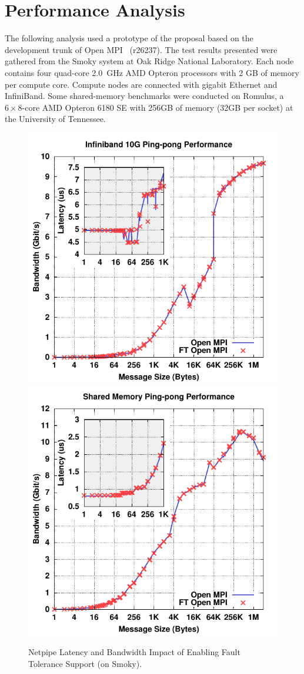 \section{Performance Analysis}
\label{sect:performance}

The following analysis used a prototype of the \ulfm proposal based on
the development trunk of Open MPI~\cite{gabriel04:_open_mpi} (r26237).
The test results presented were gathered from the Smoky system at Oak
Ridge National Laboratory. Each node contains four quad-core 2.0~GHz AMD
Opteron processors with 2 GB of memory per compute core. Compute nodes
are connected with gigabit Ethernet and InfiniBand. Some shared-memory
benchmarks were conducted on Romulus, a $6\times8$-core AMD Opteron 6180
SE with 256GB of memory (32GB per socket) at the University of Tennessee.

\begin{figure}[ht]
\includegraphics[width=.49\textwidth]{figures/np-ibsmoky}
\hfill
\includegraphics[width=.49\textwidth]{figures/np-smsmoky}
\caption{Netpipe Latency and Bandwidth Impact of Enabling Fault Tolerance Support (on Smoky)\label{fig:netpipe}.}
\end{figure}

